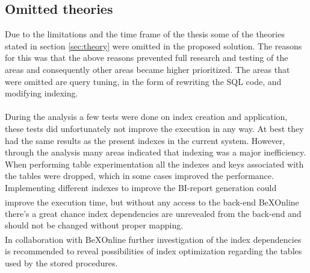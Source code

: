 \documentclass{cslthse-msc}
\newcommand{\bex}{BeX\textsuperscript{\textregistered}}
\begin{document}
\subsection{Omitted theories}
Due to the limitations and the time frame of the thesis some of the theories stated in section \ref{sec:theory} were omitted in the proposed solution. The reasons for this was that the above reasons prevented full research and testing of the areas and consequently other areas became higher prioritized. The areas that were omitted are query tuning, in the form of rewriting the SQL code, and modifying indexing.\\\\During the analysis a few tests were done on index creation and application, these tests did unfortunately not improve the execution in any way. At best they had the same results as the present indexes in the current system. However, through the analysis many areas indicated that indexing was a major inefficiency. When performing table experimentation all the indexes and keys associated with the tables were dropped, which in some cases improved the performance. Implementing different indexes to improve the BI-report generation could improve the execution time, but without any access to the back-end \bex Online there's a great chance index dependencies are unrevealed from the back-end and should not be changed without proper mapping.\\ In collaboration with \bex Online further investigation of the index dependencies is recommended to reveal possibilities of index optimization regarding the tables used by the stored procedures.\\\\
\end{document}
